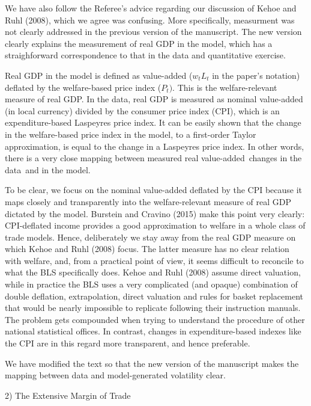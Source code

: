 \documentclass[12pt]{article}
\begin{document}
We have also follow the Referee's advice regarding our discussion of Kehoe
and Ruhl (2008), which we agree was confusing. More specifically, measurment
was not clearly addressed in the previous version of the manuscript. The new
version clearly explains the measurement of real GDP in the model, which has
a straighforward correspondence to that in the data and quantitative
exercise.

Real GDP in the model is defined as value-added ($w_{t}L_{t}$ in the paper's
notation) deflated by the welfare-based price index ($P_{t})$. This is the
welfare-relevant measure of real GDP. In the data, real GDP is measured as
nominal value-added (in local currency) divided by the consumer price index
(CPI), which is an expenditure-based Laspeyres price index. It can be easily
shown that the change in the welfare-based price index in the model, to a
first-order Taylor approximation, is equal to the change in a Laspeyres
price index. In other words, there is a very close mapping between measured
real value-added\ changes in the data\ and in the model.

To be clear, we focus on the nominal value-added deflated by the CPI because
it maps closely and transparently into the welfare-relevant measure of real
GDP dictated by the model. Burstein and Cravino (2015) make this point very
clearly: CPI-deflated income provides a good approximation to welfare in a
whole class of trade models. Hence, deliberately we stay away from the real
GDP measure on which Kehoe and Ruhl (2008) focus. The latter measure has no
clear relation with welfare, and, from a practical point of view, it seems
difficult to reconcile to what the BLS specifically does. Kehoe and Ruhl
(2008) assume direct valuation, while in practice the BLS uses a very
complicated (and opaque) combination of double deflation, extrapolation,
direct valuation and rules for basket replacement that would be nearly
impossible to replicate following their instruction manuals. The problem
gets compounded when trying to understand the procedure of other national
statistical offices. In contrast, changes in expenditure-based indexes like
the CPI are in this regard more transparent, and hence preferable.

We have modified the text so that the new version of the manuscript makes
the mapping between data and model-generated volatility clear.

\bigskip

2) The Extensive Margin of Trade
\end{document}
